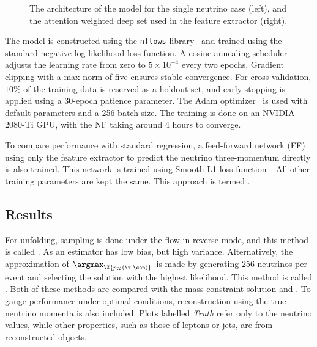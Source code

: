 \begin{figure}[ht]
    \centering
    \caption{The architecture of the \vflows model for the single neutrino case (left), and the attention weighted deep set used in the feature extractor (right).}
    \label{fig:flow}
\end{figure}

The model is constructed using the \texttt{nflows} library~\cite{nflows} and trained using the standard negative log-likelihood loss function.
A cosine annealing scheduler adjusts the learning rate from zero to $5\times 10^{-4}$ every two epochs.
Gradient clipping with a max-norm of five ensures stable convergence.
For cross-validation, $10\%$ of the training data is reserved as a holdout set, and early-stopping is applied using a 30-epoch patience parameter.
The Adam optimizer~\cite{Adam} is used with default parameters and a 256 batch size.
The training is done on an NVIDIA 2080-Ti GPU, with the NF taking around 4 hours to converge.

To compare performance with standard regression, a feed-forward network (FF) using only the feature extractor to predict the neutrino three-momentum directly is also trained.
This network is trained using Smooth-L1 loss function~\cite{SmoothL1}.
All other training parameters are kept the same.
This approach is termed \vff.

\subsection{Results}

For unfolding, sampling is done under the flow in reverse-mode, and this method is called \vsample.
As an estimator \vsample has low bias, but high variance.
Alternatively, the approximation of $\argmax_\X{p_X(\x|\con)}$ is made by generating 256 neutrinos per event and selecting the solution with the highest likelihood.
This method is called \vmode.
Both of these methods are compared with the mass constraint solution and \vff.
To gauge performance under optimal conditions, reconstruction using the true neutrino momenta is also included.
Plots labelled \emph{Truth} refer only to the neutrino values, while other properties, such as those of leptons or jets, are from reconstructed objects.

